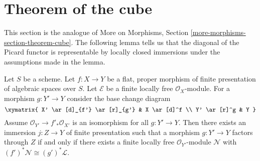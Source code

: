 \section{Theorem of the cube}
\label{section-theorem-cube}

\noindent
This section is the analogue of More on Morphisms, Section
\ref{more-morphisms-section-theorem-cube}.
The following lemma tells us that the diagonal of the Picard
functor is representable by locally closed immersions under
the assumptions made in the lemma.

\begin{lemma}
\label{lemma-diagonal-picard-flat-proper}
Let $S$ be a scheme.
Let $f : X \to Y$ be a flat, proper morphism of finite presentation
of algebraic spaces over $S$.
Let $\mathcal{E}$ be a finite locally free $\mathcal{O}_X$-module.
For a morphism $g : Y' \to Y$ consider the base change diagram
$$
\xymatrix{
X' \ar[d]_{f'} \ar[r]_{g'} & X \ar[d]^f \\
Y' \ar[r]^g & Y
}
$$
Assume $\mathcal{O}_{Y'} \to f'_*\mathcal{O}_{X'}$ is an
isomorphism for all $g : Y' \to Y$.
Then there exists an immersion $j : Z \to Y$ of finite presentation
such that a morphism $g : Y' \to Y$ factors through $Z$ if and only if
there exists a finite locally free $\mathcal{O}_{Y'}$-module $\mathcal{N}$
with $(f')^*\mathcal{N} \cong (g')^*\mathcal{L}$.
\end{lemma}

